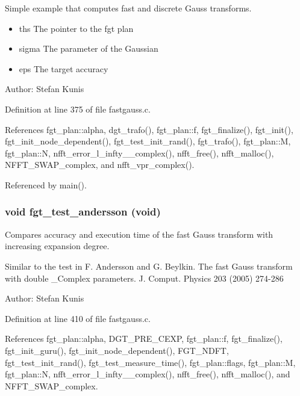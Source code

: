 Simple example that computes fast and discrete Gauss transforms. 

\begin{itemize}
\item ths The pointer to the fgt plan \item sigma The parameter of the Gaussian \item eps The target accuracy\end{itemize}
\begin{Desc}
\item[Author:]Stefan Kunis \end{Desc}


Definition at line 375 of file fastgauss.c.

References fgt\_\-plan::alpha, dgt\_\-trafo(), fgt\_\-plan::f, fgt\_\-finalize(), fgt\_\-init(), fgt\_\-init\_\-node\_\-dependent(), fgt\_\-test\_\-init\_\-rand(), fgt\_\-trafo(), fgt\_\-plan::M, fgt\_\-plan::N, nfft\_\-error\_\-l\_\-infty\_\_\-complex(), nfft\_\-free(), nfft\_\-malloc(), NFFT\_\-SWAP\_\-complex, and nfft\_\-vpr\_\-complex().

Referenced by main().\hypertarget{group__applications__fastgauss_gac05fa78924012be74e54ddbd098892f}{
\subsubsection{\setlength{\rightskip}{0pt plus 5cm}void fgt\_\-test\_\-andersson (void)}}
\label{group__applications__fastgauss_gac05fa78924012be74e54ddbd098892f}


Compares accuracy and execution time of the fast Gauss transform with increasing expansion degree. 

Similar to the test in F. Andersson and G. Beylkin. The fast Gauss transform with double \_\-Complex parameters. J. Comput. Physics 203 (2005) 274-286

\begin{Desc}
\item[Author:]Stefan Kunis \end{Desc}


Definition at line 410 of file fastgauss.c.

References fgt\_\-plan::alpha, DGT\_\-PRE\_\-CEXP, fgt\_\-plan::f, fgt\_\-finalize(), fgt\_\-init\_\-guru(), fgt\_\-init\_\-node\_\-dependent(), FGT\_\-NDFT, fgt\_\-test\_\-init\_\-rand(), fgt\_\-test\_\-measure\_\-time(), fgt\_\-plan::flags, fgt\_\-plan::M, fgt\_\-plan::N, nfft\_\-error\_\-l\_\-infty\_\_\-complex(), nfft\_\-free(), nfft\_\-malloc(), and NFFT\_\-SWAP\_\-complex.

